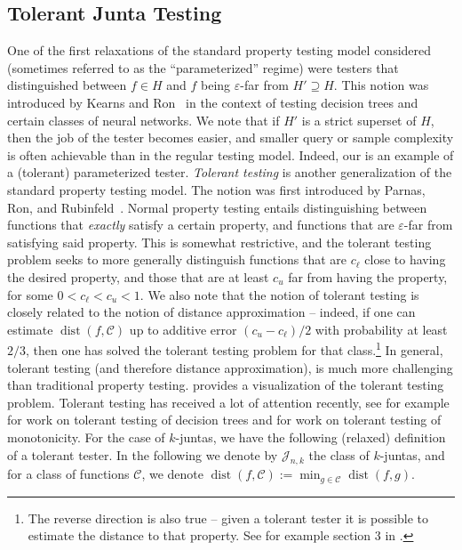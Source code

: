 \documentclass[10pt,a4paper]{article}
\theoremstyle{plain}
\theoremstyle{remark}
\theoremstyle{plain}
\newcommand{\eps}{\varepsilon}
\newcommand{\calC}{\mathcal{C}}
\newcommand{\dist}{\operatorname{dist}}
\newcommand{\Juntas}[2]{\mathcal{J}_{#1, #2}}
\renewcommand{\epsilon}{\varepsilon}
\begin{document}
\subsection{Tolerant Junta Testing}

One of the first relaxations of the standard property testing model considered (sometimes referred to as the ``parameterized'' regime) were testers that distinguished between $f \in H$ and $f$ being $\eps$-far from $H'\supseteq H$. This notion was introduced by Kearns and Ron~\cite{DBLP:journals/jcss/KearnsR00} in the context of testing decision trees and certain classes of neural networks. We note that if $H'$ is a strict superset of $H$, then the job of the tester becomes easier, and smaller query or sample complexity is often achievable than in the regular testing model. Indeed, our  is an example of a (tolerant) parameterized tester.
\textit{Tolerant testing} is another generalization of the standard property testing model. The notion was first introduced by Parnas, Ron, and Rubinfeld~\cite{og-tolerant}. 
Normal property testing entails distinguishing between functions that \textit{exactly} satisfy a certain property, and functions that are $\epsilon$-far from satisfying said property. 
This is somewhat restrictive, and the tolerant testing problem seeks to more generally distinguish functions that are $c_\ell$ close to having the desired property, and those that are at least $c_u$ far from having the property, for some $0 < c_\ell < c_u < 1$.  
We also note that the notion of tolerant testing is closely related to the notion of distance approximation -- indeed, if one can estimate $\dist(f, \calC)$ up to additive error $(c_u - c_\ell)/2$ with probability at least $2/3$, then one has solved the tolerant testing problem for that class.\footnote{The reverse direction is also true -- given a tolerant tester it is possible to estimate the distance to that property. See for example section 3 in \cite{ailon-chazelle-monotonicity-tolerant}.} In general, tolerant testing (and therefore distance approximation), is much more challenging than traditional property testing.  provides a visualization of the tolerant testing problem. 
Tolerant testing has received a lot of attention recently, see for example \cite{LYT-testing-reconstruction-DTs} for work on tolerant testing of decision trees and \cite{ailon-chazelle-monotonicity-tolerant} \cite{junta-lbs-PRW20} for work on tolerant testing of monotonicity. For the case of $k$-juntas, we have the following (relaxed) definition of a tolerant tester. In the following we denote by $\Juntas{n}{k}$ the class of $k$-juntas, and for a class of functions $\calC$, we denote $\dist(f,\calC) := \min_{g\in \calC}\dist(f,g)$.
\end{document}
